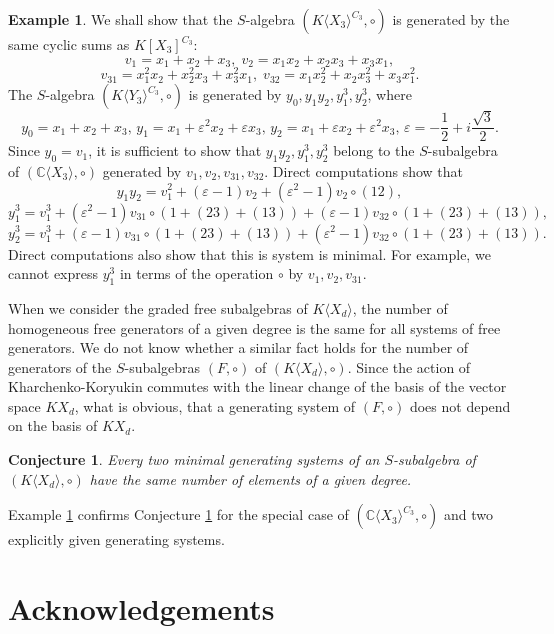 \documentclass{amsart}
\newtheorem{conjecture}[theorem]{Conjecture}
\theoremstyle{definition}
\newtheorem{example}[theorem]{Example}
\begin{document}
\begin{example}\label{three noncommutative variables}
We shall show that the $S$-algebra $(K\langle X_3\rangle^{C_3},\circ)$ is generated by the same cyclic sums as $K[X_3]^{C_3}$:
\[
v_1=x_1+x_2+x_3,\;v_2=x_1x_2+x_2x_3+x_3x_1,
\]
\[
v_{31}=x_1^2x_2+x_2^2x_3+x_3^2x_1,\;v_{32}=x_1x_2^2+x_2x_3^2+x_3x_1^2.
\]
The $S$-algebra $(K\langle Y_3\rangle^{C_3},\circ)$ is generated by $y_0,y_1y_2,y_1^3,y_2^3$, where
\[
y_0=x_1+x_2+x_3,\,y_1=x_1+\varepsilon^2x_2+\varepsilon x_3,\,y_2=x_1+\varepsilon x_2+\varepsilon^2x_3,\,\varepsilon=-\frac{1}{2}+i\frac{\sqrt{3}}{2}.
\]
Since $y_0=v_1$, it is sufficient to show that $y_1y_2,y_1^3,y_2^3$ belong to the $S$-subalgebra of $({\mathbb C}\langle X_3\rangle,\circ)$
generated by $v_1,v_2,v_{31},v_{32}$. Direct computations show that
\[
y_1y_2=v_1^2+(\varepsilon-1)v_2+(\varepsilon^2-1)v_2\circ(12),
\]
\[
y_1^3=v_1^3+(\varepsilon^2-1)v_{31}\circ(1+(23)+(13))+(\varepsilon-1)v_{32}\circ(1+(23)+(13)),
\]
\[
y_2^3=v_1^3+(\varepsilon-1)v_{31}\circ(1+(23)+(13))+(\varepsilon^2-1)v_{32}\circ(1+(23)+(13)).
\]
Direct computations also show that this is system is minimal. For example, we cannot express $y_1^3$ in terms of the operation $\circ$ by $v_1,v_2,v_{31}$.
\end{example}

When we consider the graded free subalgebras of $K\langle X_d\rangle$, the number of homogeneous free generators of a given degree is the same for all systems of free generators.
We do not know whether a similar fact holds for the number of generators of the $S$-subalgebras $(F,\circ)$ of $(K\langle X_d\rangle,\circ)$.
Since the action of Kharchenko-Koryukin commutes with the linear change of the basis of the vector space $KX_d$,
what is obvious, that a generating system of $(F,\circ)$ does not depend on the basis of $KX_d$.

\begin{conjecture}\label{conjecture}
Every two minimal generating systems of an $S$-subalgebra of $(K\langle X_d\rangle,\circ)$ have the same number of elements of a given degree.
\end{conjecture}

Example \ref{three noncommutative variables} confirms Conjecture \ref{conjecture} for the special case of $({\mathbb C}\langle X_3\rangle^{C_3},\circ)$
and two explicitly given generating systems.

\section*{Acknowledgements}
\end{document}
